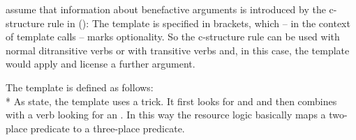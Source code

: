 \citet*[]{AGT2014a} assume that information about benefactive arguments is introduced by the
c-structure rule in ():
\ea\label{c-struc-vp-benefactive}
\z
The  template is specified in brackets, which -- in the context of template calls -- marks optionality. So the
c-structure rule can be used with normal ditransitive verbs or with transitive verbs and, in this
case, the  template would apply and license a further argument.

The  template is defined as follows:
\ea
    {\tempeq}\\*
\z
As \citet[]{AGT2014a} state, the template uses a trick. It first looks for  and
 and then combines with a verb looking for an . In this way the resource
logic basically maps a two-place predicate to a three-place predicate.

